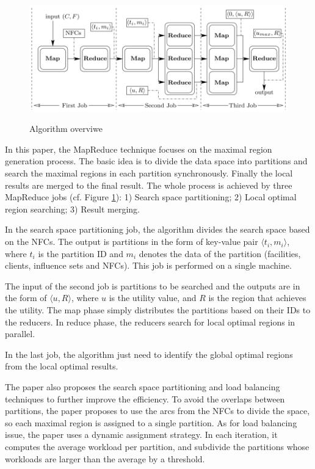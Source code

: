 \documentclass[paper=a4, fontsize=18pt]{article} %
\numberwithin{equation}{section} %
\numberwithin{figure}{section} %
\numberwithin{table}{section} %
\begin{document}
\begin{figure}[h]
  \centering
  \includegraphics[width=1\linewidth]{8_15_LSUM2.png}\\
  \caption{Algorithm overviwe}\label{fig:LSUM2}
\end{figure}

In this paper, the MapReduce technique focuses on the maximal region generation process. The basic idea is to divide the data space into partitions and search the maximal regions in each partition synchronously. Finally the local results are merged to the final result. The whole process is achieved by three MapReduce jobs (cf. Figure \ref{fig:LSUM2}): 1) Search space partitioning; 2) Local optimal region searching; 3) Result merging.

In the search space partitioning job, the algorithm divides the search space based on the NFCs. The output is partitions in the form of key-value pair $\langle t_i, m_i \rangle$, where $t_i$ is the partition ID and $m_i$ denotes the data of the partition (facilities, clients, influence sets and NFCs). This job is performed on a single machine.

The input of the second job is partitions to be searched and the outputs are in the form of $\langle u, R \rangle$, where $u$ is the utility value, and $R$ is the region that achieves the utility. The map phase simply distributes the partitions based on their IDs to the reducers. In reduce phase, the reducers search for local optimal regions in parallel.

In the last job, the algorithm just need to identify the global optimal regions from the local optimal results.

The paper also proposes the search space partitioning and load balancing techniques to further improve the efficiency. To avoid the overlaps between partitions, the paper proposes to use the arcs from the NFCs to divide the space, so each maximal region is assigned to a single partition. As for load balancing issue, the paper uses a dynamic assignment strategy. In each iteration, it computes the average workload per partition, and subdivide the partitions whose workloads are larger than the average by a threshold.
\end{document}
